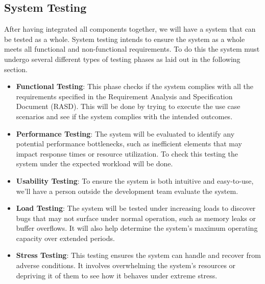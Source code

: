 %
\subsection{System Testing}
After having integrated all components together, we will have a system that can be tested as a whole. System testing intends to ensure the system as a whole meets all functional and non-functional requirements. To do this the system must undergo several different types of testing phases as laid out in the following section.

\begin{itemize}
    \item[] \textbf{Functional Testing}: This phase checks if the system complies with all the requirements specified in the Requirement Analysis and Specification Document (RASD). This will be done by trying to execute the use case scenarios and see if the system complies with the intended outcomes.

    \item[] \textbf{Performance Testing}: The system will be evaluated to identify any potential performance bottlenecks, such as inefficient elements that may impact response times or resource utilization. To check this testing the system under the expected workload will be done. 
    
    \item[] \textbf{Usability Testing}: To ensure the system is both intuitive and easy-to-use, we'll have a person outside the development team evaluate the system. 
    
    \item[] \textbf{Load Testing}: The system will be tested under increasing loads to discover bugs that may not surface under normal operation, such as memory leaks or buffer overflows. It will also help determine the system's maximum operating capacity over extended periods.
    
    \item[] \textbf{Stress Testing}: This testing ensures the system can handle and recover from adverse conditions. It involves overwhelming the system's resources or depriving it of them to see how it behaves under extreme stress.

\end{itemize}



